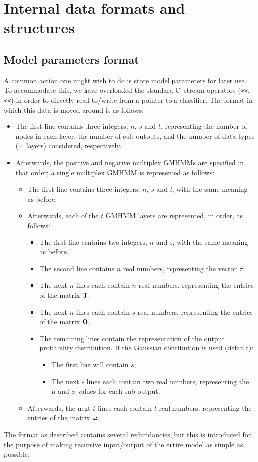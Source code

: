 \documentclass[12pt]{article}
\def\CC{{C\nolinebreak[4]\hspace{-.05em}\raisebox{.4ex}{\tiny\bf ++}}}
\begin{document}
	\section{Internal data formats and structures}\label{sec:format}
	\subsection{Model parameters format}
	A common action one might wish to do is store model parameters for later use. To accommodate this, we have overloaded the standard \CC\ stream operators ({\tt >\/>}, {\tt <\/<}) in order to directly read to/write from a pointer to a classifier. The format in which this data is moved around is as follows:
	\begin{itemize}
		\item The first line contains three integers, $n$, $s$ and $t$, representing the number of nodes in each layer, the number of sub-outputs, and the number of data types ($\sim$ layers) considered, respectively.
		\item Afterwards, the positive and negative multiplex GMHMMs are specified in that order; a single multiplex GMHMM is represented as follows:
		\begin{itemize}
			\item The first line contains three integers, $n$, $s$ and $t$, with the same meaning as before.
			\item Afterwards, each of the $t$ GMHMM layers are represented, in order, as follows:
			\begin{itemize}
				\item The first line contains two integers, $n$ and $s$, with the same meaning as before.
				\item The second line contains $n$ real numbers, representing the vector $\vec{\pi}$.
				\item The next $n$ lines each contain $n$ real numbers, representing the entries of the matrix $\bf T$.
				\item The next $n$ lines each contain $s$ real numbers, representing the entries of the matrix $\bf O$.
				\item The remaining lines contain the representation of the output probability distribution. If the Gaussian distribution is used (default):
					\begin{itemize}
					\item The first line will contain $s$;
					\item The next $s$ lines each contain two real numbers, representing the $\mu$ and $\sigma$ values for each sub-output.
					\end{itemize}
			\end{itemize}
			\item Afterwards, the next $t$ lines each contain $t$ real numbers, representing the entries of the matrix $\boldsymbol\omega$.
		\end{itemize}
	\end{itemize}
	The format as described contains several redundancies, but this is introduced for the purpose of making recursive input/output of the entire model as simple as possible.
\end{document}
